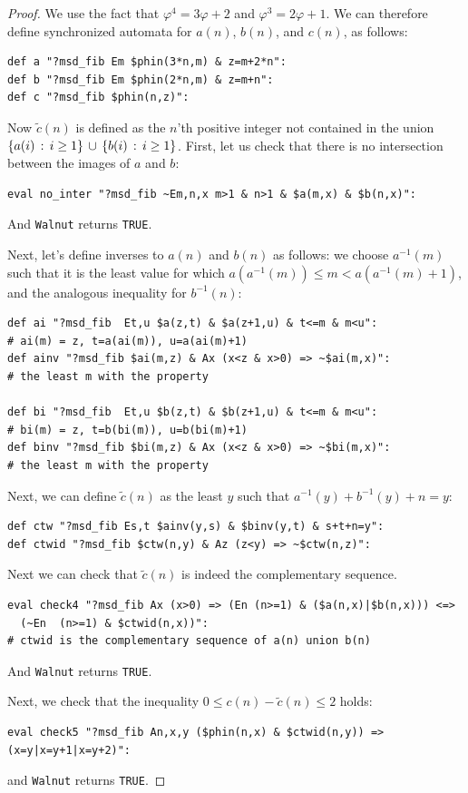 \documentclass[12pt,reqno]{article}
\begin{document}
\begin{proof}
We use the fact that $\varphi^4 = 3\varphi + 2$ and $\varphi^3 = 2\varphi + 1$.  We can therefore define synchronized automata for
$a(n)$, $b(n)$, and $c(n)$, as follows:
\begin{verbatim}
def a "?msd_fib Em $phin(3*n,m) & z=m+2*n":
def b "?msd_fib Em $phin(2*n,m) & z=m+n":
def c "?msd_fib $phin(n,z)":
\end{verbatim}


Now $\tilde{c}(n)$ is defined as the $n$'th positive integer not contained in the union $\{ a(i) \, : \, i \geq 1 \} \, \cup \, 
\{ b(i) \, : \, i \geq 1 \}$.
First, let us check that there is no intersection between the images
of $a$ and $b$:
\begin{verbatim}
eval no_inter "?msd_fib ~Em,n,x m>1 & n>1 & $a(m,x) & $b(n,x)":
\end{verbatim}
And {\tt Walnut} returns {\tt TRUE}.

Next, let's define inverses to $a(n)$ and $b(n)$ as follows:  
we choose $a^{-1} (m)$ such that it is the least value for
which $a(a^{-1} (m)) \leq m < a(a^{-1}(m) + 1)$, and the
analogous inequality for $b^{-1} (n)$:
\begin{verbatim}
def ai "?msd_fib  Et,u $a(z,t) & $a(z+1,u) & t<=m & m<u":
# ai(m) = z, t=a(ai(m)), u=a(ai(m)+1)
def ainv "?msd_fib $ai(m,z) & Ax (x<z & x>0) => ~$ai(m,x)":
# the least m with the property

def bi "?msd_fib  Et,u $b(z,t) & $b(z+1,u) & t<=m & m<u":
# bi(m) = z, t=b(bi(m)), u=b(bi(m)+1)
def binv "?msd_fib $bi(m,z) & Ax (x<z & x>0) => ~$bi(m,x)":
# the least m with the property
\end{verbatim}

Next, we can define ${\tilde{c}}(n)$ as the least $y$
such that $a^{-1} (y) + b^{-1}(y) + n = y$:
\begin{verbatim}
def ctw "?msd_fib Es,t $ainv(y,s) & $binv(y,t) & s+t+n=y":
def ctwid "?msd_fib $ctw(n,y) & Az (z<y) => ~$ctw(n,z)":
\end{verbatim}

Next we can check that $\tilde{c}(n)$ is indeed the complementary
sequence.
\begin{verbatim}
eval check4 "?msd_fib Ax (x>0) => (En (n>=1) & ($a(n,x)|$b(n,x))) <=> 
  (~En  (n>=1) & $ctwid(n,x))":
# ctwid is the complementary sequence of a(n) union b(n)
\end{verbatim}
And {\tt Walnut} returns {\tt TRUE}.

Next, we check that the inequality $0 \leq c(n) - \tilde{c}(n) \leq 2$ holds:
\begin{verbatim}
eval check5 "?msd_fib An,x,y ($phin(n,x) & $ctwid(n,y)) => (x=y|x=y+1|x=y+2)":
\end{verbatim}
and {\tt Walnut} returns {\tt TRUE}.


\end{proof}
\end{document}
